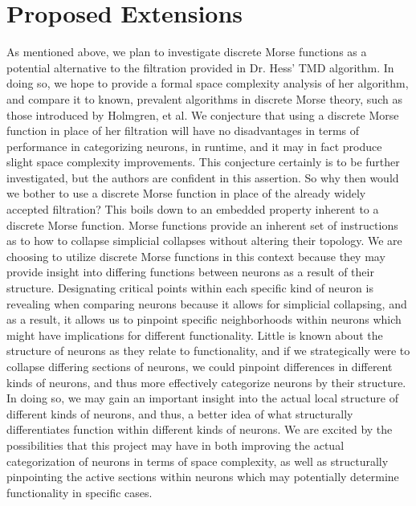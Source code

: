 \documentclass[11pt]{article}
\begin{document}
\section*{Proposed Extensions}
As mentioned above, we plan to investigate discrete Morse functions as a potential alternative to the filtration provided in Dr. Hess' TMD algorithm. In doing so, we hope to provide a formal space complexity analysis
of her algorithm, and compare it to known, prevalent algorithms in discrete Morse theory, such as those introduced by Holmgren, et al. We conjecture that using a discrete Morse function in place of her filtration will have
no disadvantages in terms of performance in categorizing neurons, in runtime, and it may in fact produce slight space complexity improvements. This conjecture certainly is to be further investigated, but the authors
are confident in this assertion. So why then would we bother to use a discrete Morse function in place of the already widely accepted filtration? This boils down to an embedded property inherent to a discrete Morse 
function. Morse functions provide an inherent set of instructions as to how to collapse simplicial collapses without altering their topology. We are choosing to utilize discrete Morse functions in this context because they 
may provide insight into differing functions between neurons as a result of their structure. Designating critical points within each specific kind of neuron is revealing when comparing neurons because it allows for simplicial 
collapsing, and as a result, it allows us
to pinpoint specific neighborhoods within neurons which might have implications for different functionality. Little is known about the structure of neurons as they relate to functionality, and if we strategically were to collapse differing
sections of neurons, we could pinpoint differences in different kinds of neurons, and thus more effectively categorize neurons by their structure.
In doing so, we may gain an important insight into the actual local structure of different kinds of neurons, and thus, a better
idea of what structurally differentiates function within different kinds of neurons. We are excited by the possibilities that this project may have in both improving the actual categorization of neurons in terms of space complexity,
as well as structurally pinpointing the active sections within neurons which may potentially determine functionality in specific cases. 
\end{document}
